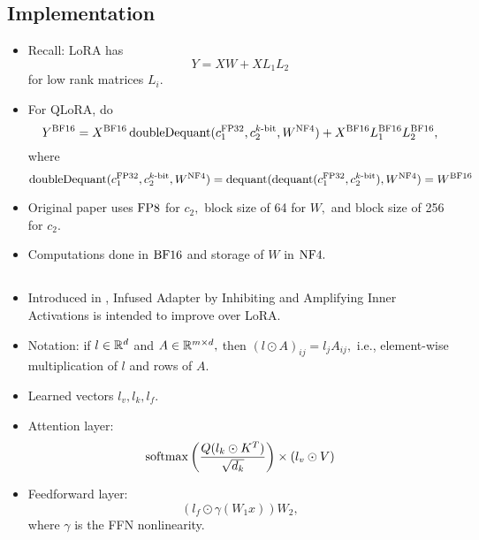 \subsection{Implementation}
\begin{itemize}
    \item Recall: LoRA has
    \begin{equation*}
        Y = XW + XL_1L_2
    \end{equation*}
    for low rank matrices $L_i.$
    \item For QLoRA, do
    \begin{equation*}
        Y^{\mathrm{BF} 16} = X^{\mathrm{BF} 16}\operatorname{doubleDequant}(c_1^{\mathrm{FP} 32}, c_2^{k\text{-bit}}, W^{\mathrm{NF} 4}) + X^{\mathrm{BF} 16}L_1^{\mathrm{BF} 16}L_2^{\mathrm{BF} 16},
    \end{equation*}
    where
    \begin{equation*}
        \operatorname{doubleDequant}(c_1^{\mathrm{FP} 32}, c_2^{k\text{-bit}}, W^{\mathrm{NF} 4}) = \operatorname{dequant}(\operatorname{dequant}(c_1^{\mathrm{FP} 32}, c_2^{k\text{-bit}}), W^{\mathrm{NF} 4}) = W^{\mathrm{BF} 16}
    \end{equation*}
    \item Original paper \cite{qlora} uses $\mathrm{FP} 8$ for $c_2,$ block size of 64 for $W,$ and block size of 256 for $c_2.$
    \item Computations done in $\mathrm{BF} 16$ and storage of $W$ in $\mathrm{NF} 4.$
\end{itemize}

\subsection{\texorpdfstring{\iat}{IA3}}
\begin{itemize}
    \item Introduced in \cite{ia3}, Infused Adapter by Inhibiting and Amplifying Inner Activations is intended to improve over LoRA.
    \item Notation: if $l \in \mathbb{R}^d$ and $A \in \mathbb{R}^{m \times d},$ then $(l \odot A)_{ij} = l_jA_{ij},$ i.e., element-wise multiplication of $l$ and rows of $A.$
    \item Learned vectors $l_v,l_k,l_f.$
    \item Attention layer:
    \begin{equation*}
        \operatorname{softmax}\left(\frac{Q(l_k \odot K^T)}{\sqrt{d_k}}\right) \times (l_v \odot V)
    \end{equation*}
    \item Feedforward layer:
    \begin{equation*}
        (l_f \odot \gamma(W_1x))W_2,
    \end{equation*}
    where $\gamma$ is the FFN nonlinearity.
\end{itemize}